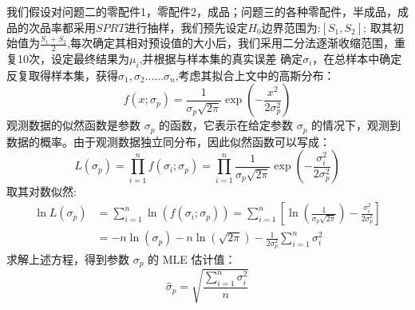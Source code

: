\documentclass[withoutpreface,bwprint]{cumcmthesis} %
\begin{document}
我们假设对问题二的零配件1，零配件2，成品；问题三的各种零配件，半成品，成品的次品率都采用$SPRT$进行抽样，我们预先设定$H_0$边界范围为:$[S_1,S_2]$;
取其初始值为$\frac{S_1+S_2}{2}$,每次确定其相对预设值的大小后，我们采用二分法逐渐收缩范围，重复10次，设定最终结果为$\mu_i$,并根据与样本集的真实误差
确定$\sigma_i$，在总样本中确定反复取得样本集，获得$\sigma_1,\sigma_2......\sigma_n$,考虑其拟合上文中的高斯分布：
\begin{equation}
	f(x; \sigma_p) = \frac{1}{\sigma_p \sqrt{2\pi}} \exp\left(-\frac{x^2}{2\sigma_p^2}\right)
\end{equation}
观测数据的似然函数是参数 $\sigma_p$ 的函数，它表示在给定参数 $\sigma_p$ 的情况下，观测到数据的概率。由于观测数据独立同分布，因此似然函数可以写成：
\begin{equation}
	L(\sigma_p) = \prod_{i=1}^n f(\sigma_i; \sigma_p) = \prod_{i=1}^n \frac{1}{\sigma_p \sqrt{2\pi}} \exp\left(-\frac{\sigma_i^2}{2\sigma_p^2}\right)
\end{equation}
取其对数似然:
\begin{equation}
	\begin{split}
		\ln L(\sigma_p) &= \sum_{i=1}^n \ln(f(\sigma_i; \sigma_p)) = \sum_{i=1}^n \left[ \ln\left(\frac{1}{\sigma_p \sqrt{2\pi}}\right) - \frac{\sigma_i^2}{2\sigma_p^2} \right] \\
		&= -n \ln(\sigma_p) - n \ln(\sqrt{2\pi}) - \frac{1}{2\sigma_p^2} \sum_{i=1}^n \sigma_i^2
	\end{split}
\end{equation}
求解上述方程，得到参数 $\sigma_p$ 的 MLE 估计值：
\begin{equation}
	\hat{\sigma}_p = \sqrt{\frac{\sum_{i=1}^n \sigma_i^2}{n}}
\end{equation}
\end{document}
